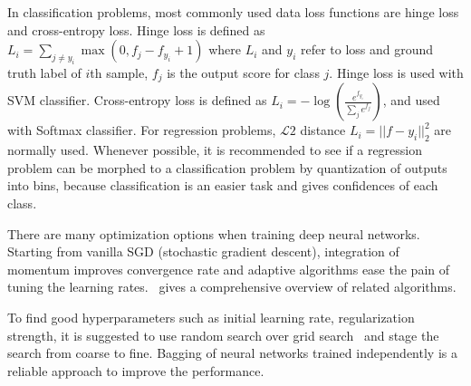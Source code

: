 \begin{description}[labelindent=1cm]
  \item[Loss Functions] In classification problems, most commonly used data loss functions are hinge loss and cross-entropy loss. Hinge loss is defined as $L_i = \sum_ {j\neq y_i} \max(0, f_j-f_{y_i}+1)$ where $L_i$ and $y_i$ refer to loss and ground truth label of $i$th sample, $f_j$ is the output score for class $j$. Hinge loss is used with SVM classifier. Cross-entropy loss is defined as $L_i = -\log(\frac{e^{f_{y_i}}}{\sum_je^{f_j}})$, and used with Softmax classifier. For regression problems, $\mathcal{L}2$ distance $L_i = ||f - y_i||_2^2$ are normally used. Whenever possible, it is recommended to see if a regression problem can be morphed to a classification problem by quantization of outputs into bins, because classification is an easier task and gives confidences of each class.
  \item[Optimization] There are many optimization options when training deep neural networks. Starting from vanilla SGD (stochastic gradient descent), integration of momentum improves convergence rate and adaptive algorithms ease the pain of tuning the learning rates. \cite{links:sgdoptimization}~gives a comprehensive overview of related algorithms.
  \item[Miscellous] To find good hyperparameters such as initial learning rate, regularization strength, it is suggested to use random search over grid search~\cite{bergstra2012random} and stage the search from coarse to fine. Bagging of neural networks trained independently is a reliable approach to improve the performance.
\end{description}

